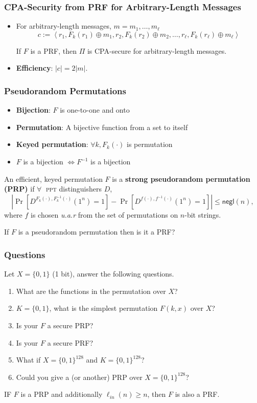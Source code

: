 \begin{frame}\frametitle{CPA-Security from PRF for Arbitrary-Length Messages}
\begin{itemize}
\item For arbitrary-length messages, $m = m_1, \dots , m_{\ell}$
\[ c := \left< r_1, F_k(r_1) \oplus m_1, r_2, F_k(r_2) \oplus m_2, \dots, r_\ell, F_k(r_\ell) \oplus m_\ell\right>
\]
\begin{corollary}
If $F$ is a PRF, then $\Pi$ is CPA-secure for arbitrary-length messages.
\end{corollary}
\item \textbf{Efficiency}: $|c| = 2|m|$. 
\end{itemize}
\end{frame}
\begin{frame}\frametitle{Pseudorandom Permutations}
\begin{itemize}
\item \textbf{Bijection}: $F$ is one-to-one and onto
\item \textbf{Permutation}: A bijective function from a set to itself
\item \textbf{Keyed permutation}: $\forall k, F_k(\cdot)$ is permutation
\item $F$ is a bijection $\iff F^{-1}$ is a bijection
\end{itemize}
\begin{definition}
An efficient, keyed permutation $F$ is a \textbf{strong pseudorandom permutation (PRP)} if
$\forall\;$ \textsc{ppt} distinguishers $D$,
\[ \left|\Pr[D^{F_k(\cdot),F_k^{-1}(\cdot)}(1^n)=1] - \Pr[D^{f(\cdot),f^{-1}(\cdot)}(1^n)=1]\right| \le \mathsf{negl}(n),
\]
where $f$ is chosen \emph{u.a.r} from the set of permutations on $n$-bit strings.
\end{definition}
\begin{alertblock}{If $F$ is a pseudorandom permutation then is it a PRF?}
\end{alertblock}
\end{frame}
\begin{frame}\frametitle{Questions}
\begin{exampleblock}{Let $X = \{ 0,1\}$ (1 bit), answer the following questions.}
\begin{enumerate}
\item What are the functions in the permutation over $X$?
\item $K = \{0, 1\}$, what is the simplest permutation $F(k, x)$ over $X$? 
\item Is your $F$ a secure PRP?
\item Is your $F$ a secure PRF?
\item What if $X = \{ 0,1\}^{128}$ and $K = \{0, 1\}^{128}$?
\item Could you give a (or another) PRP over $X = \{ 0,1\}^{128}$?
\end{enumerate}
\end{exampleblock}
\begin{proposition}
IF $F$ is a PRP and additionally $\ell_{in} (n) \ge n$, then $F$ is also a PRF.
\end{proposition}
\end{frame}
